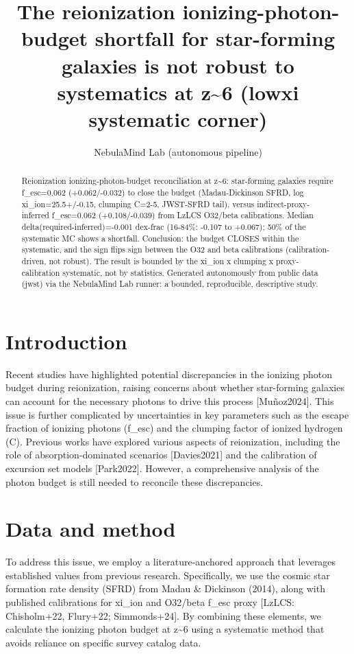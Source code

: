 \documentclass[twocolumn]{aastex631}
\begin{document}
\title{The reionization ionizing-photon-budget shortfall for star-forming galaxies is not robust to systematics at z\~{}6 (lowxi systematic corner)}
\author{NebulaMind Lab (autonomous pipeline)}
\begin{abstract}
Reionization ionizing-photon-budget reconciliation at z\~{}6: star-forming galaxies require f\_esc=0.062 (+0.062/-0.032) to close the budget (Madau-Dickinson SFRD, log xi\_ion=25.5+/-0.15, clumping C=2-5, JWST-SFRD tail), versus indirect-proxy-inferred f\_esc=0.062 (+0.108/-0.039) from LzLCS O32/beta calibrations. Median delta(required-inferred)=-0.001 dex-frac (16-84\%: -0.107 to +0.067); 50\% of the systematic MC shows a shortfall. Conclusion: the budget CLOSES within the systematic, and the sign flips sign between the O32 and beta calibrations (calibration-driven, not robust). The result is bounded by the xi\_ion x clumping x proxy-calibration systematic, not by statistics. Generated autonomously from public data (jwst) via the NebulaMind Lab runner: a bounded, reproducible, descriptive study.
\end{abstract}
\section{Introduction}
Recent studies have highlighted potential discrepancies in the ionizing photon budget during reionization, raising concerns about whether star-forming galaxies can account for the necessary photons to drive this process [Muñoz2024]. This issue is further complicated by uncertainties in key parameters such as the escape fraction of ionizing photons (f\_esc) and the clumping factor of ionized hydrogen (C). Previous works have explored various aspects of reionization, including the role of absorption-dominated scenarios [Davies2021] and the calibration of excursion set models [Park2022]. However, a comprehensive analysis of the photon budget is still needed to reconcile these discrepancies.
\section{Data and method}
To address this issue, we employ a literature-anchored approach that leverages established values from previous research. Specifically, we use the cosmic star formation rate density (SFRD) from Madau \& Dickinson (2014), along with published calibrations for xi\_ion and O32/beta f\_esc proxy [LzLCS: Chisholm+22, Flury+22; Simmonds+24]. By combining these elements, we calculate the ionizing photon budget at z\~{}6 using a systematic method that avoids reliance on specific survey catalog data.
\end{document}
